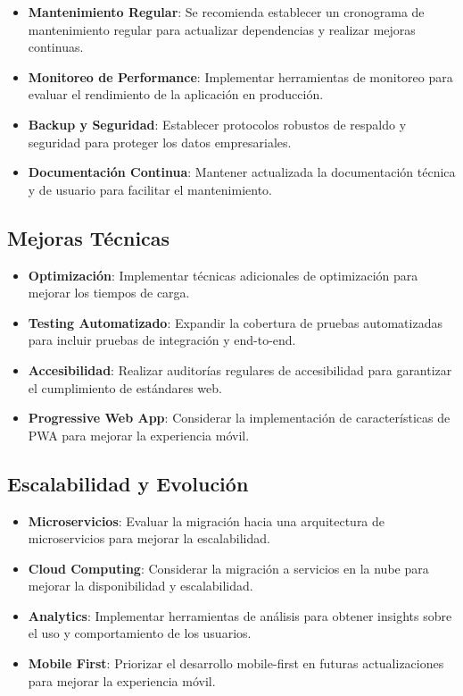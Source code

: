 \begin{itemize}
    \item \textbf{Mantenimiento Regular}: Se recomienda establecer un cronograma de mantenimiento regular para actualizar dependencias y realizar mejoras continuas.
    \item \textbf{Monitoreo de Performance}: Implementar herramientas de monitoreo para evaluar el rendimiento de la aplicación en producción.
    \item \textbf{Backup y Seguridad}: Establecer protocolos robustos de respaldo y seguridad para proteger los datos empresariales.
    \item \textbf{Documentación Continua}: Mantener actualizada la documentación técnica y de usuario para facilitar el mantenimiento.
\end{itemize}

\subsection{Mejoras Técnicas}

\begin{itemize}
    \item \textbf{Optimización}: Implementar técnicas adicionales de optimización para mejorar los tiempos de carga.
    \item \textbf{Testing Automatizado}: Expandir la cobertura de pruebas automatizadas para incluir pruebas de integración y end-to-end.
    \item \textbf{Accesibilidad}: Realizar auditorías regulares de accesibilidad para garantizar el cumplimiento de estándares web.
    \item \textbf{Progressive Web App}: Considerar la implementación de características de PWA para mejorar la experiencia móvil.
\end{itemize}

\subsection{Escalabilidad y Evolución}

\begin{itemize}
    \item \textbf{Microservicios}: Evaluar la migración hacia una arquitectura de microservicios para mejorar la escalabilidad.
    \item \textbf{Cloud Computing}: Considerar la migración a servicios en la nube para mejorar la disponibilidad y escalabilidad.
    \item \textbf{Analytics}: Implementar herramientas de análisis para obtener insights sobre el uso y comportamiento de los usuarios.
    \item \textbf{Mobile First}: Priorizar el desarrollo mobile-first en futuras actualizaciones para mejorar la experiencia móvil.
\end{itemize}

